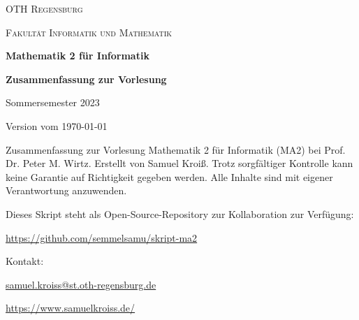 
\begin{titlepage}
    \centering
    
    {
        \textsc{OTH Regensburg} \par
    }
    {
        \textsc{Fakultät Informatik und Mathematik} \par
    }
    \vspace{8cm}
    {
        \huge\bfseries Mathematik 2 für Informatik\par
    }
    \vspace{12pt}
    {
        \Large\bfseries Zusammenfassung zur Vorlesung\par
    }
    \vspace{8cm}
    {
        \large Sommersemester 2023 \par 
        Version vom \today\par
    }
    \vfill
    {
        Zusammenfassung zur Vorlesung Mathematik 2 für Informatik (MA2) bei Prof. Dr. Peter M. Wirtz. Erstellt von Samuel Kroiß. Trotz sorgfältiger Kontrolle kann keine Garantie auf Richtigkeit gegeben werden. Alle Inhalte sind mit eigener Verantwortung anzuwenden.
    }
\end{titlepage}

\thispagestyle{empty}
{
    \footnotesize

    Dieses Skript steht als Open-Source-Repository zur Kollaboration zur Verfügung:\par
    \vspace{2pt}
    \url{https://github.com/semmelsamu/skript-ma2}\par

    \vspace{12pt}

    Kontakt:\par
    \vspace{1pt}
    \url{samuel.kroiss@st.oth-regensburg.de}\par
    \url{https://www.samuelkroiss.de/}
}
